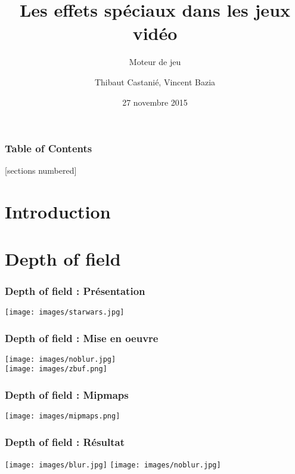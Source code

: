 \documentclass[10pt]{beamer}
\title{Les effets spéciaux dans les jeux vidéo}
\subtitle{Moteur de jeu}
\date{27 novembre 2015}
\author{Thibaut Castanié, Vincent Bazia}
\institute{Master IMAGINA - Université Montpellier}
\begin{document}
\maketitle

\begin{frame}
  \frametitle{Table of Contents}
  [sections numbered]
  \tableofcontents[hideallsubsections]
\end{frame}

\section{Introduction}



\section{Depth of field}
\begin{frame}
	\frametitle{Depth of field : Présentation}
    \begin{center}
	\texttt{[image: images/starwars.jpg]}
	\end{center}
\end{frame}

\begin{frame}
	\frametitle{Depth of field : Mise en oeuvre}
    \begin{center}
    \texttt{[image: images/noblur.jpg]}\\
    \pause
    \texttt{[image: images/zbuf.png]}
	\end{center}
    
\end{frame}

\begin{frame}
	\frametitle{Depth of field : Mipmaps}
    \begin{center}
    \texttt{[image: images/mipmaps.png]}
	\end{center}
\end{frame}

\begin{frame}
	\frametitle{Depth of field : Résultat}
    \begin{center}
    \texttt{[image: images/blur.jpg]}
    \hspace{0.2cm}
    \pause
    \texttt{[image: images/noblur.jpg]}
	\end{center}
\end{frame}
\end{document}

